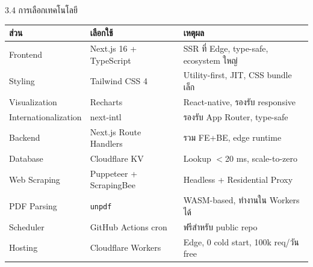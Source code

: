 \documentclass[aspectratio=169,11pt]{beamer}
\begin{document}
\begin{frame}{3.4 การเลือกเทคโนโลยี}
  \footnotesize
  \begin{table}
    \centering
    \begin{tabularx}{\textwidth}{l l X}
      \toprule
      \textbf{ส่วน} & \textbf{เลือกใช้} & \textbf{เหตุผล} \\
      \midrule
      Frontend         & Next.js 16 + TypeScript & SSR ที่ Edge, type-safe, ecosystem ใหญ่ \\
      Styling          & Tailwind CSS 4          & Utility-first, JIT, CSS bundle เล็ก \\
      Visualization    & Recharts                & React-native, รองรับ responsive \\
      Internationalization & next-intl           & รองรับ App Router, type-safe \\
      Backend          & Next.js Route Handlers  & รวม FE+BE, edge runtime \\
      Database         & Cloudflare KV           & Lookup $<$20 ms, scale-to-zero \\
      Web Scraping     & Puppeteer + ScrapingBee & Headless + Residential Proxy \\
      PDF Parsing      & \texttt{unpdf}          & WASM-based, ทำงานใน Workers ได้ \\
      Scheduler        & GitHub Actions cron     & ฟรีสำหรับ public repo \\
      Hosting          & Cloudflare Workers      & Edge, 0 cold start, 100k req/วัน free \\
      \bottomrule
    \end{tabularx}
  \end{table}
\end{frame}
\end{document}
